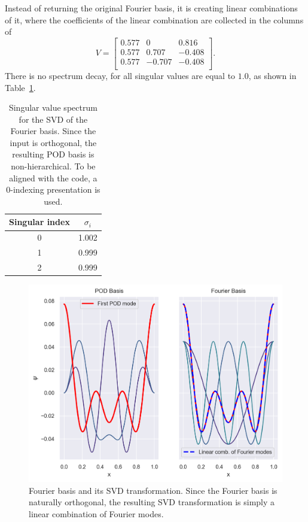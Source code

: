 \documentclass[../../thesis.tex]{subfiles}
\begin{document}
Instead of returning the original Fourier basis, 
it is creating linear combinations of it, 
where the coefficients of the linear combination are collected in the columns of
\begin{equation}
    V = \begin{bmatrix}
        0.577 &  0     &  0.816 \\
        0.577 &  0.707 & -0.408 \\
        0.577 & -0.707 & -0.408 \\
    \end{bmatrix}.
\end{equation}
There is no spectrum decay, for all singular values are equal to $1.0$,
as shown in Table~\ref{tab:appendix_fourier_spectrum}.
\begin{table}[h]
    \centering
    \caption{Singular value spectrum for the SVD of the Fourier basis.
    Since the input is orthogonal, the resulting POD basis is non-hierarchical.
    To be aligned with the code, a 0-indexing presentation is used.}
    \begin{tabular}{cc}
        \toprule
        Singular index & $\sigma_i$ \\
        \midrule
        0 &  1.002 \\
        1 &  0.999 \\
        2 &  0.999 \\
        \bottomrule
    \end{tabular}
    \label{tab:appendix_fourier_spectrum}
\end{table}

\begin{figure}[h]
    \includegraphics[width=\columnwidth]{research_project/piston/figures/svd_fourier/fourier_pod_bases.png}
    \caption{Fourier basis and its SVD transformation. 
    Since the Fourier basis is naturally orthogonal, 
    the resulting SVD transformation is simply a linear combination of Fourier modes.}
\end{figure}
\end{document}
